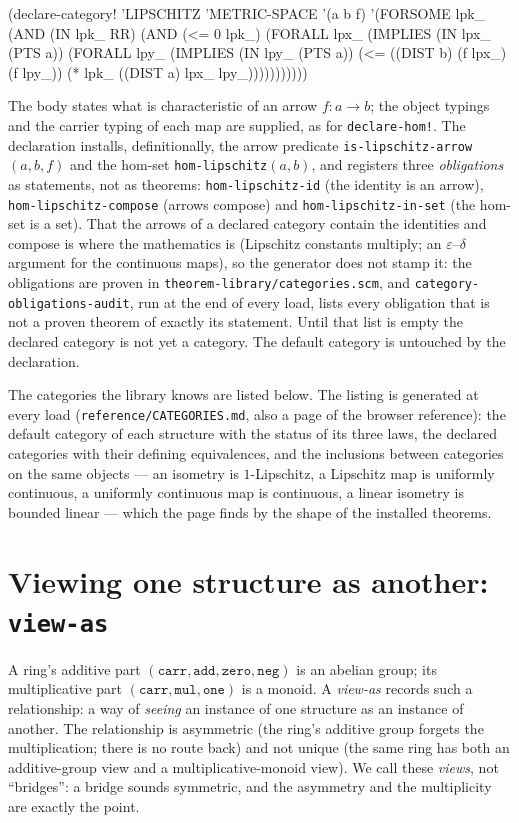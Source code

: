 \begin{VNBcode}
(declare-category! 'LIPSCHITZ 'METRIC-SPACE '(a b f)
  '(FORSOME lpk_ (AND (IN lpk_ RR) (AND (<= 0 lpk_)
     (FORALL lpx_ (IMPLIES (IN lpx_ (PTS a))
       (FORALL lpy_ (IMPLIES (IN lpy_ (PTS a))
         (<= ((DIST b) (f lpx_) (f lpy_))
             (* lpk_ ((DIST a) lpx_ lpy_)))))))))))
\end{VNBcode}

The body states what is characteristic of an arrow $f \colon a \to b$; the
object typings and the carrier typing of each map are supplied, as for
\texttt{declare-hom!}.  The declaration installs, definitionally, the arrow
predicate \texttt{is-lipschitz-arrow}$(a, b, f)$ and the hom-set
\texttt{hom-lipschitz}$(a, b)$, and registers three \emph{obligations} as
statements, not as theorems: \texttt{hom-lipschitz-id} (the identity is an
arrow), \texttt{hom-lipschitz-compose} (arrows compose) and
\texttt{hom-lipschitz-in-set} (the hom-set is a set).  That the arrows of a
declared category contain the identities and compose is where the
mathematics is (Lipschitz constants multiply; an $\varepsilon$--$\delta$
argument for the continuous maps), so the generator does not stamp it: the
obligations are proven in \texttt{theorem-library/categories.scm}, and
\texttt{category-obligations-audit}, run at the end of every load, lists
every obligation that is not a proven theorem of exactly its statement.
Until that list is empty the declared category is not yet a category.  The
default category is untouched by the declaration.

The categories the library knows are listed below.  The listing is generated
at every load (\texttt{reference/CATEGORIES.md}, also a page of the browser
reference): the default category of each structure with the status of its
three laws, the declared categories with their defining equivalences, and the
inclusions between categories on the same objects --- an isometry is
$1$-Lipschitz, a Lipschitz map is uniformly continuous, a uniformly
continuous map is continuous, a linear isometry is bounded linear --- which
the page finds by the shape of the installed theorems.



\section{Viewing one structure as another: \texttt{view-as}}
\label{sec:view-as}

A ring's additive part $(\mathtt{carr}, \mathtt{add}, \mathtt{zero},
\mathtt{neg})$ is an abelian group; its multiplicative part
$(\mathtt{carr}, \mathtt{mul}, \mathtt{one})$ is a monoid.  A
\emph{view-as} records such a relationship: a way of \emph{seeing} an
instance of one structure as an instance of another.  The relationship
is asymmetric (the ring's additive group forgets the multiplication;
there is no route back) and not unique (the same ring has both an
additive-group view and a multiplicative-monoid view).  We call these
\emph{views}, not ``bridges'': a bridge sounds symmetric, and the
asymmetry and the multiplicity are exactly the point.

